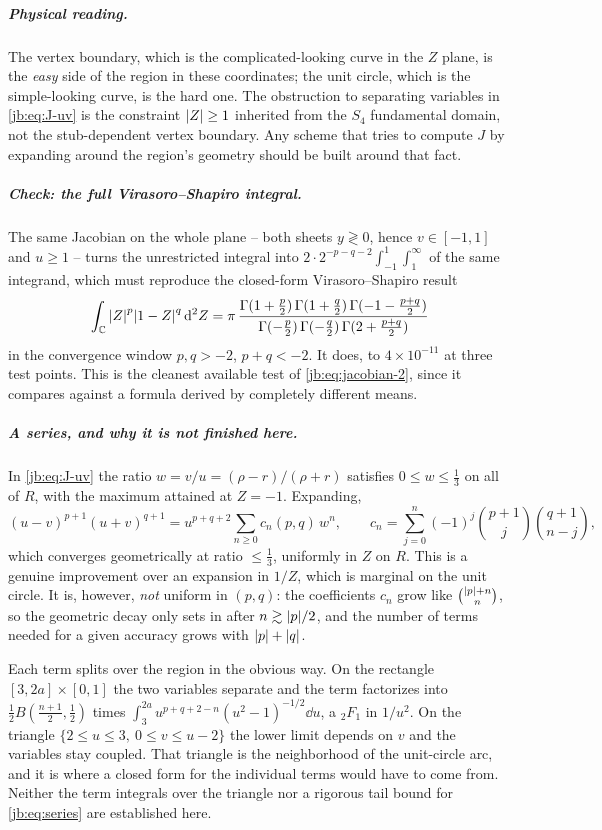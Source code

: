 \subparagraph{Physical reading.}
The vertex boundary, which is the complicated-looking curve in the $Z$ plane, is the \emph{easy}
side of the region in these coordinates; the unit circle, which is the simple-looking curve, is the
hard one.
The obstruction to separating variables in \eqref{jb:eq:J-uv} is the constraint ${|Z|} \ge 1$
inherited from the $S_4$ fundamental domain, not the stub-dependent vertex boundary.
Any scheme that tries to compute $J$ by expanding around the region's geometry should be built
around that fact.

\subparagraph{Check: the full Virasoro--Shapiro integral.}
The same Jacobian on the whole plane -- both sheets $y \gtrless 0$, hence $v \in [-1, 1]$ and
$u \ge 1$ -- turns the unrestricted integral into
$2 \cdot 2^{-p-q-2} \int_{-1}^{1} \! \int_1^{\infty}$ of the same integrand, which must reproduce the
closed-form Virasoro--Shapiro result
\begin{equation}
  \label{jb:eq:VS}
  \int_{\mathbb{C}} {|Z|}^p {|1 - Z|}^q \, \mathrm{d}^2 Z
    = \pi \,
      \frac{\Gamma(1 + \tfrac{p}{2}) \, \Gamma(1 + \tfrac{q}{2}) \,
        \Gamma(- 1 - \tfrac{p+q}{2})}
        {\Gamma(- \tfrac{p}{2}) \, \Gamma(- \tfrac{q}{2}) \,
        \Gamma(2 + \tfrac{p+q}{2})}
\end{equation}
in the convergence window $p, q > -2$, $p + q < -2$.
It does, to $4 \times 10^{-11}$ at three test points.
This is the cleanest available test of \eqref{jb:eq:jacobian-2}, since it compares against a formula
derived by completely different means.

\subparagraph{A series, and why it is not finished here.}
In \eqref{jb:eq:J-uv} the ratio $w = v/u = (\rho - r)/(\rho + r)$ satisfies $0 \le w \le \tfrac13$ on
all of $R$, with the maximum attained at $Z = -1$.
Expanding,
\begin{equation}
  \label{jb:eq:series}
  (u - v)^{p+1} (u + v)^{q+1}
    = u^{p+q+2} \sum_{n \ge 0} c_n(p, q) \, w^n,
  \qquad
  c_n
    = \sum_{j=0}^{n} (-1)^j \binom{p+1}{j} \binom{q+1}{n-j},
\end{equation}
which converges geometrically at ratio $\le \tfrac13$, uniformly in $Z$ on $R$.
This is a genuine improvement over an expansion in $1/Z$, which is marginal on the unit circle.
It is, however, \emph{not} uniform in $(p, q)$: the coefficients $c_n$ grow like
$\binom{{|p|} + n}{n}$, so the geometric decay only sets in after $n \gtrsim {|p|}/2$, and the
number of terms needed for a given accuracy grows with ${|p|} + {|q|}$.

Each term splits over the region in the obvious way.
On the rectangle $[3, 2a] \times [0, 1]$ the two variables separate and the term factorizes into
$\tfrac12 B(\tfrac{n+1}{2}, \tfrac12)$ times $\int_3^{2a} u^{p+q+2-n} (u^2-1)^{-1/2} \dd u$, a
${}_2F_1$ in $1/u^2$.
On the triangle $\{ 2 \le u \le 3, \ 0 \le v \le u - 2 \}$ the lower limit depends on $v$ and the
variables stay coupled.
That triangle is the neighborhood of the unit-circle arc, and it is where a closed form for the
individual terms would have to come from.
Neither the term integrals over the triangle nor a rigorous tail bound for \eqref{jb:eq:series} are
established here.

